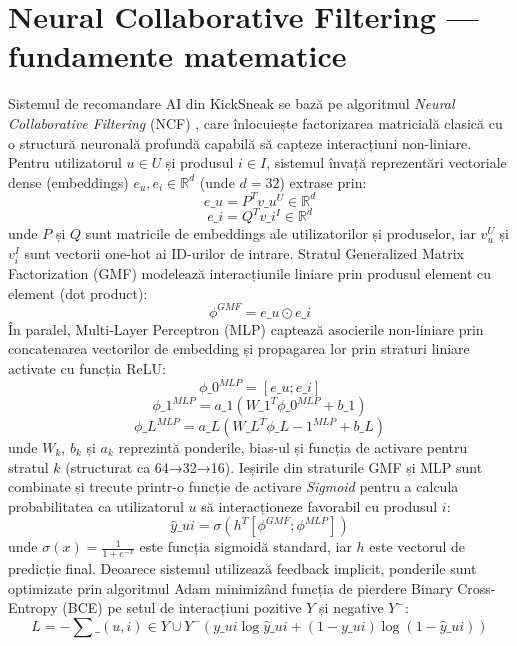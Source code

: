 \section{Neural Collaborative Filtering --- fundamente matematice}

Sistemul de recomandare AI din KickSneak se bază pe algoritmul \textit{Neural Collaborative Filtering} (NCF) \cite{he2017ncf}, care înlocuiește factorizarea matricială clasică cu o structură neuronală profundă capabilă să capteze interacțiuni non-liniare. Pentru utilizatorul $u \in U$ și produsul $i \in I$, sistemul învață reprezentări vectoriale dense (embeddings) $e_u, e_i \in \mathbb{R}^d$ (unde $d=32$) extrase prin:
\begin{equation}
e\_u = P^T v\_u^U \in \mathbb{R}^d
\end{equation}
\begin{equation}
e\_i = Q^T v\_i^I \in \mathbb{R}^d
\end{equation}
unde $P$ și $Q$ sunt matricile de embeddings ale utilizatorilor și produselor, iar $v_u^U$ și $v_i^I$ sunt vectorii one-hot ai ID-urilor de intrare. Stratul Generalized Matrix Factorization (GMF) modelează interacțiunile liniare prin produsul element cu element (dot product):
\begin{equation}
\phi^{GMF} = e\_u \odot e\_i
\end{equation}
În paralel, Multi-Layer Perceptron (MLP) captează asocierile non-liniare prin concatenarea vectorilor de embedding și propagarea lor prin straturi liniare activate cu funcția ReLU:
\begin{equation}
\phi\_0^{MLP} = [e\_u; e\_i]
\end{equation}
\begin{equation}
\phi\_1^{MLP} = a\_1(W\_1^T \phi\_0^{MLP} + b\_1)
\end{equation}
\begin{equation}
\phi\_L^{MLP} = a\_L(W\_L^T \phi\_{L-1}^{MLP} + b\_L)
\end{equation}
unde $W_k$, $b_k$ și $a_k$ reprezintă ponderile, bias-ul și funcția de activare pentru stratul $k$ (structurat ca 64→32→16). Ieșirile din straturile GMF și MLP sunt combinate și trecute printr-o funcție de activare \textit{Sigmoid} pentru a calcula probabilitatea ca utilizatorul $u$ să interacționeze favorabil cu produsul $i$:
\begin{equation}
\hat{y}\_{ui} = \sigma(h^T [\phi^{GMF}; \phi^{MLP}])
\end{equation}
unde $\sigma(x) = \frac{1}{1 + e^{-x}}$ este funcția sigmoidă standard, iar $h$ este vectorul de predicție final. Deoarece sistemul utilizează feedback implicit, ponderile sunt optimizate prin algoritmul Adam minimizând funcția de pierdere Binary Cross-Entropy (BCE) pe setul de interacțiuni pozitive $Y$ și negative $Y^-$:
\begin{equation}
L = -\sum\_{(u,i) \in Y \cup Y^-} \left( y\_{ui} \log \hat{y}\_{ui} + (1 - y\_{ui}) \log (1 - \hat{y}\_{ui}) \right)
\end{equation}


